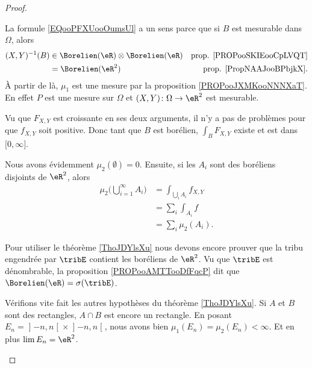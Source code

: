 \begin{proof}
\begin{subproof}
		La formule \eqref{EQooPFXUooOumsUl} a un sens parce que si \( B\) est mesurable dans \( \Omega\), alors
		\begin{subequations}
			\begin{align}
				(X,Y)^{-1}(B) & \in\Borelien(\eR)\otimes\Borelien(\eR) & \text{prop. \ref{PROPooSKIEooCpLVQT}} \\
				              & =\Borelien(\eR^2)                      & \text{prop. \ref{PropNAAJooBPbjkX}}.
			\end{align}
		\end{subequations}
		À partir de là, \( \mu_1\) est une mesure par la proposition \ref{PROPooJXMKooNNNXaT}. En effet \( P\) est une mesure sur \( \Omega\) et \((X,Y) \colon \Omega\to \eR^2  \) est mesurable.

		Vu que \( F_{X,Y}\) est croissante en ses deux arguments, il n'y a pas de problèmes pour que \( f_{X,Y}\) soit positive. Donc tant que \( B\) est borélien, \( \int_BF_{X,Y}\) existe et est dans \( \mathopen[ 0,\infty\mathclose]\).

		Nous avons évidemment \( \mu_2(\emptyset)=0\). Ensuite, si les \( A_i\) sont des boréliens disjoints de \( \eR^2\), alors
		\begin{subequations}
			\begin{align}
				\mu_2\big( \bigcup_{i=1}^{\infty}A_i \big) & =\int_{\bigcup_iA_i}f_{X,Y} \\
				                                           & =\sum_i\int_{A_i}f          \\
				                                           & =\sum_i\mu_2(A_i).
			\end{align}
		\end{subequations}

		Pour utiliser le théorème \ref{ThoJDYlsXu} nous devons encore prouver que la tribu engendrée par \( \tribE\) contient les boréliens de \( \eR^2\). Vu que \( \tribE\) est dénombrable, la proposition \ref{PROPooAMTTooDfFqcP} dit que \( \Borelien(\eR)=\sigma(\tribE)\).

		Vérifions vite fait les autres hypothèses du théorème \ref{ThoJDYlsXu}. Si \( A\) et \( B\) sont des rectangles, \( A\cap B\) est encore un rectangle. En posant \( E_n=\mathopen] -n,n\mathclose[\times \mathopen] -n,n\mathclose[\), nous avons bien \( \mu_1(E_n)=\mu_2(E_n)<\infty\). Et en plus \( \lim E_n=\eR^2\).


\end{subproof}
\end{proof}
